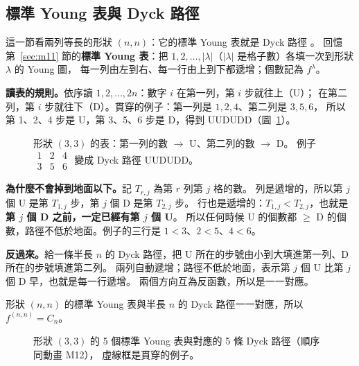 

\subsection{標準 Young 表與 Dyck 路徑}\label{sec:m12}

這一節看兩列等長的形狀 $(n,n)$：它的標準 Young 表就是 Dyck 路徑 。
回憶第~\ref{sec:m11} 節的\textbf{標準 Young 表}：把 $1,2,\ldots,|\lambda|$（$|\lambda|$ 是格子數）各填一次到形狀 $\lambda$ 的 Young 圖，
每一列由左到右、每一行由上到下都遞增；個數記為 $f^{\lambda}$。

\textbf{讀表的規則。}依序讀 $1,2,\ldots,2n$：數字 $i$ 在第一列，第 $i$ 步就往上（U）；
在第二列，第 $i$ 步就往下（D）。貫穿的例子：第一列是 $1,2,4$、第二列是 $3,5,6$，
所以第 1、2、4 步是 U，第 3、5、6 步是 D，得到 UUDUDD（圖~\ref{fig:m12-convert}）。

\begin{figure}[H]
\centering
\FigMXIIConvert
\caption{形狀 $(3,3)$ 的表：\textcolor{cLeft}{第一列的數 $\to$ U}、\textcolor{cRight}{第二列的數 $\to$ D}。
例子 $\begin{smallmatrix}1&2&4\\3&5&6\end{smallmatrix}$ 變成 Dyck 路徑 UUDUDD。}
\label{fig:m12-convert}
\end{figure}

\textbf{為什麼不會掉到地面以下。}記 $T_{r,j}$ 為第 $r$ 列第 $j$ 格的數。
列是遞增的，所以第 $j$ 個 U 是第 $T_{1,j}$ 步，第 $j$ 個 D 是第 $T_{2,j}$ 步。
行也是遞增的：$T_{1,j}<T_{2,j}$，也就是\textbf{第 $j$ 個 D 之前，一定已經有第 $j$ 個 U}。
所以任何時候 U 的個數都 $\ge$ D 的個數，路徑不低於地面。例子的三行是 $1<3$、$2<5$、$4<6$。

\textbf{反過來。}給一條半長 $n$ 的 Dyck 路徑，把 U 所在的步號由小到大填進第一列、D 所在的步號填進第二列。
兩列自動遞增；路徑不低於地面，表示第 $j$ 個 U 比第 $j$ 個 D 早，也就是每一行遞增。
兩個方向互為反函數，所以是一一對應。

\begin{thmbox}
形狀 $(n,n)$ 的標準 Young 表與半長 $n$ 的 Dyck 路徑一一對應，所以 $f^{(n,n)}=C_n$。
\end{thmbox}

\begin{figure}[H]
\centering
\FigMXIIAll
\caption{形狀 $(3,3)$ 的 5 個標準 Young 表與對應的 5 條 Dyck 路徑（順序同動畫 M12），
\textcolor{cTop}{虛線框}是貫穿的例子。}
\label{fig:m12-all}
\end{figure}

